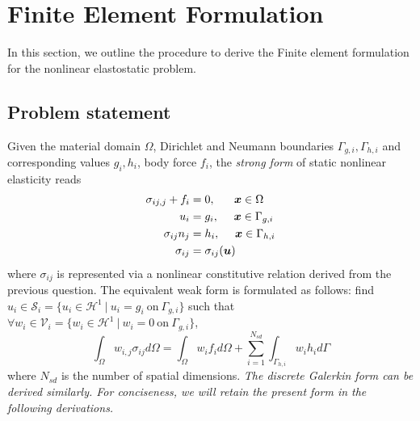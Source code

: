 \section{Finite Element Formulation}
In this section, we outline the procedure to derive the Finite element formulation for the nonlinear elastostatic problem. 

\subsection{Problem statement}
Given the material domain $\Omega$, Dirichlet and Neumann boundaries $\Gamma_{g,i}, \Gamma_{h,i}$ and corresponding values $g_i, h_i$, body force $f_i$, the \emph{strong form} of static nonlinear elasticity reads
\begin{subequations}
\begin{align}
    \sigma_{ij,j} + f_i &= 0, ~~~~~ \bm{x} \in \Omega \\
    u_i &= g_i, ~~~~ \bm{x} \in \Gamma_{g,i} \\
    \sigma_{ij} n_j &= h_i, ~~~~ \bm{x} \in \Gamma_{h,i} \\
    \sigma_{ij} &= \sigma_{ij}(\bm{u})
\end{align}
\end{subequations}
where $\sigma_{ij}$ is represented via a nonlinear constitutive relation derived from the previous question. 
The equivalent weak form is formulated as follows: find $u_i \in \mathcal{S}_i = \{ u_i \in \mathcal{H}^1 ~|~ u_i = g_i ~\textrm{on}~ \Gamma_{g,i} \}$ such that $\forall w_i \in \mathcal{V}_i = \{ w_i \in \mathcal{H}^1 ~|~ w_i = 0 ~\textrm{on}~ \Gamma_{g,i} \} $, 
\begin{equation}\label{eqn:final1_weak_form}
    \int_\Omega w_{i,j} \sigma_{ij} d\Omega = \int_\Omega w_i f_i d\Omega + \sum_{i=1}^{N_{sd}} \int_{\Gamma_{h,i}} w_i h_i d\Gamma
\end{equation}
where $N_{sd}$ is the number of spatial dimensions.
\emph{The discrete Galerkin form can be derived similarly. For conciseness, we will retain the present form in the following derivations.}

